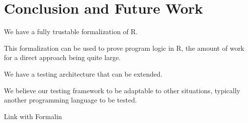 \documentclass[
    sigplan,
    10pt,
    review, %
    natbib=false %
 ]{acmart}
\begin{document}
\section{Conclusion and Future Work}
\label{sec:conclusion}

We have a fully trustable formalization of R.

This formalization can be used to prove program logic in R,
the amount of work for a direct approach being quite large.

We have a testing architecture that can be extended.

We believe our testing framework to be adaptable to other situations,
typically another programming language to be tested.

Link with Formalin

\printbibliography{}
\end{document}
